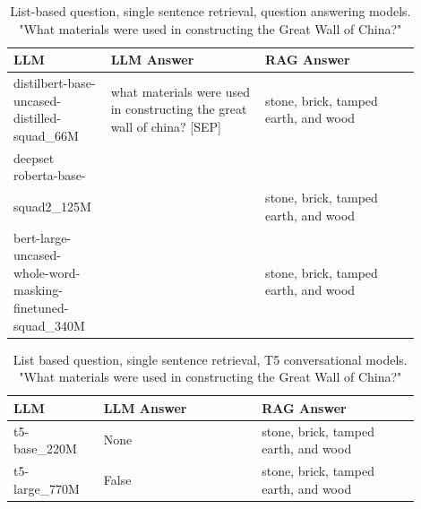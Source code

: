 \documentclass{wseas}
\begin{document}
\begin{table}[htbp]
  \centering
  \caption{List-based question, single sentence retrieval, question answering models. "What materials were used in constructing the Great Wall of China?"} %
  \label{tab:experiment_Q_listBased_R_1Sentence_Q_listBased_M_QaModels_table} 
  \begin{tabular}{|p{0.20\linewidth}|p{0.35\linewidth}|p{0.35\linewidth}|}
    \hline
    \textbf{LLM} & \textbf{LLM Answer} & \textbf{RAG Answer} \\ \hline
    \makecell[l]{distilbert-base-uncased-\\distilled-squad\_66M} & what materials were used in constructing the great wall of china? {[}SEP{]} & stone, brick, tamped earth, and wood \\ \hline
    deepset roberta-base-\\squad2\_125M & & stone, brick, tamped earth, and wood \\ \hline
    \makecell[l]{bert-large-uncased-\\whole-word-masking-\\finetuned-squad\_340M} & & stone, brick, tamped earth, and wood \\ \hline
  \end{tabular}
\end{table}
\begin{table}[htbp]
  \centering
  \caption{List based question, single sentence retrieval, T5 conversational models. "What materials were used in constructing the Great Wall of China?"} %
  \label{tab:experiment_Q_listBased_R_1Sentence_Q_listBased_M_T5Models_table} 
  \begin{tabular}{|p{0.20\linewidth}|p{0.35\linewidth}|p{0.35\linewidth}|}
    \hline
    \textbf{LLM} & \textbf{LLM Answer} & \textbf{RAG Answer} \\ \hline
    t5-base\_220M & None & stone, brick, tamped earth, and wood \\ \hline
    t5-large\_770M & False & stone, brick, tamped earth, and wood \\ \hline
  \end{tabular}
\end{table}
\end{document}
